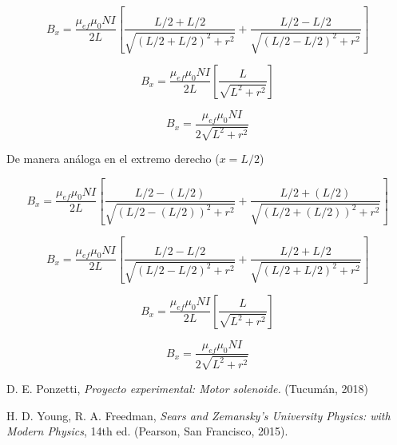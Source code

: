 \documentclass[a4paper,12pt]{article}
\begin{document}
    \begin{equation*}
        B_x = \frac{\mu_{ef}\mu_0 N I}{2L} \left[ \frac{L/2 + L/2}{\sqrt{(L/2 + L/2)^2 + r^2}} + \frac{L/2 - L/2}{\sqrt{(L/2 - L/2)^2 + r^2}} \right]
    \end{equation*}

    \begin{equation*}
        B_x = \frac{\mu_{ef}\mu_0 N I}{2L} \left[ \frac{L}{\sqrt{L^2 + r^2}} \right]
    \end{equation*}

    \begin{equation*}
        B_x = \frac{\mu_{ef}\mu_0 N I}{2\sqrt{L^2 + r^2}}
    \end{equation*}

De manera análoga en el extremo derecho ($x=L/2$)

    \begin{equation*}
        B_x = \frac{\mu_{ef}\mu_0 N I}{2L} \left[ \frac{L/2 - (L/2)}{\sqrt{(L/2 - (L/2))^2 + r^2}} + \frac{L/2 + (L/2)}{\sqrt{(L/2 + (L/2))^2 + r^2}} \right]
    \end{equation*}

    \begin{equation*}
        B_x = \frac{\mu_{ef}\mu_0 N I}{2L} \left[ \frac{L/2 - L/2}{\sqrt{(L/2 - L/2)^2 + r^2}} + \frac{L/2 + L/2}{\sqrt{(L/2 + L/2)^2 + r^2}} \right]
    \end{equation*}

    \begin{equation*}
        B_x = \frac{\mu_{ef}\mu_0 N I}{2L} \left[ \frac{L}{\sqrt{L^2 + r^2}} \right]
    \end{equation*}
    
    \begin{equation*}
        B_x = \frac{\mu_{ef}\mu_0 N I}{2\sqrt{L^2 + r^2}}
    \end{equation*}

\begin{thebibliography}{99}

    \bibitem{} D. E. Ponzetti, \emph{Proyecto experimental: Motor solenoide.} (Tucumán, 2018)

    \bibitem{} H. D. Young, R. A. Freedman, \emph{Sears and Zemansky's University Physics: with Modern Physics}, 14th ed. (Pearson, San Francisco, 2015).

\end{thebibliography}
\end{document}
